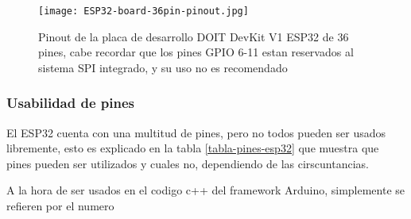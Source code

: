\documentclass[../informe_krapp.tex]{subfiles}
\begin{document}
\begin{figure}[H]
	\texttt{[image: ESP32-board-36pin-pinout.jpg]}
	\centering
	\caption{Pinout de la placa de desarrollo DOIT DevKit V1 ESP32 de 36 pines,
		cabe recordar que los pines GPIO 6-11 estan reservados al sistema SPI integrado, y su
		uso no es recomendado}
\end{figure}
\subsubsection{Usabilidad de pines}
El ESP32 cuenta con una multitud de pines, pero no todos pueden ser usados libremente,
esto es explicado en la tabla \ref{tabla-pines-esp32} que muestra que pines pueden ser utilizados y cuales no,
dependiendo de las cirscuntancias.

A la hora de ser usados en el codigo c++ del framework Arduino, simplemente se refieren
por el numero
\end{document}
